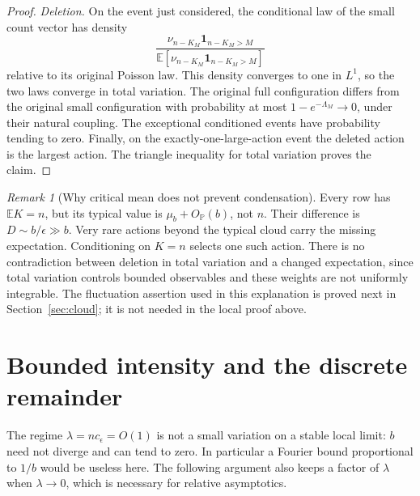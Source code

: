 \documentclass[11pt,a4paper]{article}
\numberwithin{equation}{section}
\theoremstyle{definition}
\theoremstyle{remark}
\newtheorem{remark}[theorem]{Remark}
\newcommand{\E}{\mathbb E}
\newcommand{\Prob}{\mathbb P}
\newcommand{\ee}{\epsilon}
\newcommand{\ind}{\mathbf1}
\begin{document}
\begin{proof}
\smallskip\noindent\emph{Deletion.}
On the event just considered, the conditional law of the small count
vector has density
\begin{equation}\label{eq:RN}
 \frac{\nu_{n-K_M}\ind_{n-K_M>M}}
      {\E[\nu_{n-K_M}\ind_{n-K_M>M}]}
\end{equation}
relative to its original Poisson law. This density converges to one in
$L^1$, so the two laws converge in total variation. The original full
configuration differs from the original small configuration with
probability at most $1-e^{-\Lambda_M}\to0$, under their natural coupling.
The exceptional conditioned events have probability tending to zero.
Finally, on the exactly-one-large-action event the deleted action is the
largest action. The triangle inequality for total variation proves the
claim.
\end{proof}

\begin{remark}[Why critical mean does not prevent condensation]
Every row has $\E K=n$, but its typical value is $\mu_b+O_{\Prob}(b)$,
not $n$. Their difference is $D\sim b/\ee\gg b$. Very rare actions beyond
the typical cloud carry the missing expectation. Conditioning on $K=n$
selects one such action. There is no contradiction between deletion in
total variation and a changed expectation, since total variation controls
bounded observables and these weights are not uniformly integrable.
The fluctuation assertion used in this explanation is proved next in
Section~\ref{sec:cloud}; it is not needed in the local proof above.
\end{remark}

\section{Bounded intensity and the discrete remainder}
\label{sec:sparse}
The regime $\lambda=nc_\ee=O(1)$ is not a small variation on a stable
local limit: $b$ need not diverge and can tend to zero. In particular a
Fourier bound proportional to $1/b$ would be useless here. The following
argument also keeps a factor of $\lambda$ when $\lambda\to0$, which is
necessary for relative asymptotics.
\end{document}
